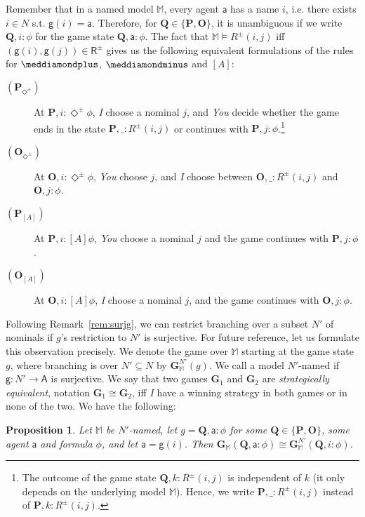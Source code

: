 \documentclass{easychair}
\newcommand{\I}{\emph{I}\xspace}
\newcommand{\You}{\emph{You}\xspace}
\newcommand{\M}{\mathbb{M}}
\newcommand{\A}{\mathsf{A}}
\newcommand{\R}{\mathsf{R}}
\newcommand{\g}{\mathsf{g}}
\newcommand{\ag}{\mathsf{a}}
\newtheorem{proposition}{Proposition}
\newcommand{\dplus}{\meddiamondplus}
\newcommand{\dminus}{\meddiamondminus}
\begin{document}
Remember that in a named model $\M$, every agent $\ag$ has a name $i$, i.e. there exists $i\in N$ s.t. $\g(i)=\ag$. Therefore, for $\mathbf{Q} \in \{\mathbf{P},\mathbf{O}\}$, it is unambiguous if we write $\mathbf{Q}, i:\phi$ for the game state $\mathbf{Q},\ag : \phi$. The fact that $\mathbb{M} \models R^{\pm}(i,j)$ iff $(\g(i),\g(j))\in \R^{\pm}$ gives us the following equivalent formulations of the rules for $\dplus$, $\dminus$ and $[A]$:

\begin{description}
    \item[$(\mathbf{P}_{\Diamond^\pm})$] At $\mathbf{P}, i: \Diamond^\pm \phi$, \I choose a nominal $j$, and \You decide whether the game ends in the state $\mathbf{P},\_:R^\pm(i,j)$ or continues with $\mathbf{P},j: \phi$.\footnote{The outcome of the game state $\mathbf{Q},k:R^{\pm}(i,j)$ is independent of $k$ (it only depends on the underlying model $\M$). Hence, we write 
        $\mathbf{P},\_:R^\pm(i,j)$ instead of $\mathbf{P},k:R^\pm(i,j)$.\label{foot:R}}
\item[$(\mathbf{O}_{\Diamond^\pm})$] \vspace{-2mm} At $\mathbf{O},i: \Diamond^\pm \phi$, \You choose  $j$, and \I choose between $\mathbf{O},\_:R^\pm(i,j)$ and $\mathbf{O},j:\phi$.
\item[$(\mathbf{P}_{[A]})$] At $\mathbf{P},i: [A]\phi$, \You choose a nominal $j$ and the game continues with $\mathbf{P},j:\phi$.
\item[$(\mathbf{O}_{[A]})$] \vspace{-2mm} At $\mathbf{O},i: [A]\phi$, \I choose a nominal $j$, and the game continues with $\mathbf{O},j: \phi$.
\end{description}

 Following Remark~\ref{rem:surjg}, we can restrict branching over a subset $N'$
 of nominals if $g$'s restriction to  $N'$ is surjective. For future reference,
 let us formulate this observation precisely. We denote the game over
 $\mathbb{M}$ starting at the game state $g$, where branching is over
 $N'\subseteq N$ by $\mathbf{G}^{N'}_\M(g)$. We call a model $N'$-named if
 $\g:N'\rightarrow \A$ is surjective. We say that two games $\mathbf{G}_1$ and
 $\mathbf{G}_2$ are \emph{strategically equivalent}, notation $\mathbf{G}_1\cong
 \mathbf{G}_2$, iff \I have a winning strategy in both games or in none of the
 two. We have the following:

\begin{proposition}
    \label{prop:surjg}
Let $\M$ be $N'$-named, let $g=\mathbf{Q},\ag:\phi$ for some $\mathbf{Q}\in
\{\mathbf{P},\mathbf{O}\}$, some agent $\ag$ and formula $\phi$, and let
$\ag=\g(i)$. Then $\mathbf{G}_\M(\mathbf{Q},\ag:\phi)\cong
\mathbf{G}^{N'}_\M(\mathbf{Q},i:\phi)$. 
\end{proposition}
\end{document}
